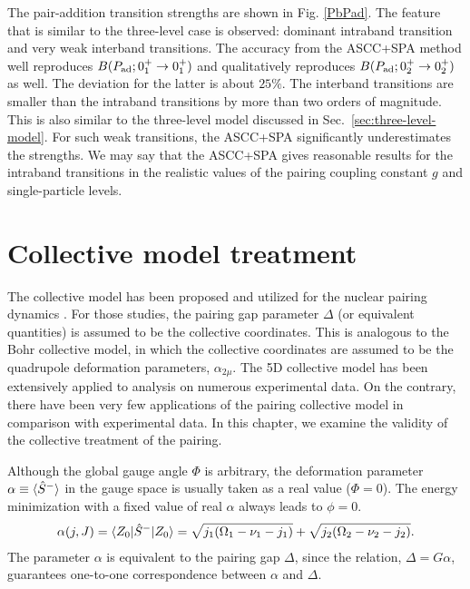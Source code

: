\documentclass[11pt]{book} %
\begin{document}
The pair-addition transition strengths are shown in Fig. \ref{PbPad}.
The feature that is similar to the three-level case is observed:
dominant intraband transition and very weak interband transitions.
The accuracy from the ASCC+SPA method well reproduces
$B(P_{\rm ad};0_1^+\rightarrow 0_1^+)$
and qualitatively reproduces
$B(P_{\rm ad};0_2^+\rightarrow 0_2^+)$ as well.
The deviation for the latter is about $25\%$.
The interband transitions are smaller than the intraband transitions
by more than two orders of magnitude.
This is also similar to the three-level model discussed
in Sec.~\ref{sec:three-level-model}.
For such weak transitions, the ASCC+SPA significantly
underestimates the strengths.
We may say that the ASCC+SPA gives reasonable results for the intraband
transitions in the realistic values of the pairing coupling constant $g$ and
single-particle levels.



\clearpage{\pagestyle{empty}\cleardoublepage}
\chapter{Collective model treatment}
\label{collective}

The collective model has been proposed
and utilized for the nuclear pairing dynamics
\cite{BBPK70,GPBW85, ZPPRS99, P07}.
For those studies, the pairing gap parameter $\Delta$ (or equivalent quantities)
is assumed to be the collective coordinates.
This is analogous to the Bohr collective model,
in which the collective coordinates are assumed to be the
quadrupole deformation parameters, $\alpha_{2\mu}$.
The 5D collective model has been 
extensively applied to analysis on numerous experimental data.
On the contrary, there have been very few applications of
the pairing collective model
in comparison with experimental data.
In this chapter, we examine the validity of
the collective treatment of the pairing.

Although the global gauge angle $\Phi$ is arbitrary,
the deformation parameter $\alpha\equiv \braket{ \hat{S}^- }$
in the gauge space is
usually taken as a real value ($\Phi=0$).
The energy minimization with a fixed value of real $\alpha$ always
leads to $\phi=0$.
\begin{align}
\alpha(j,J) = \braket{Z_0|\hat{S}^-|Z_0}
	= \sqrt{j_1(\Omega_1-\nu_1-j_1)} +\sqrt{j_2(\Omega_2-\nu_2-j_2)}.
 \label{Delta_BCS}
\end{align}
The parameter $\alpha$ is equivalent to the pairing gap $\Delta$,
since the relation, $\Delta=G\alpha$,
guarantees one-to-one correspondence between $\alpha$ and $\Delta$. 
\end{document}

